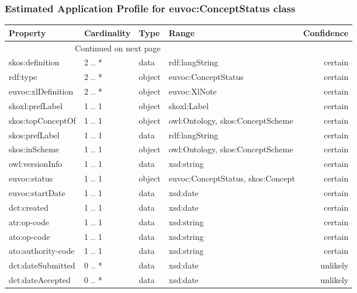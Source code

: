 \documentclass[10pt,a4paper,titlepage,final]{article}
\begin{document}
\subsubsection{Estimated Application Profile for euvoc:ConceptStatus class}
\begin{tabularx}{\textwidth}{lllXr}
\toprule
           Property & Cardinality &    Type &                              Range & Confidence \\
\midrule
\endhead
\midrule
\multicolumn{3}{r}{{Continued on next page}} \\
\midrule
\endfoot

\bottomrule
\endlastfoot
    skos:definition &      2 .. * &    data &                     rdf:langString &    certain \\
           rdf:type &      2 .. * &  object &                euvoc:ConceptStatus &    certain \\
 euvoc:xlDefinition &      2 .. * &  object &                       euvoc:XlNote &    certain \\
    skoxl:prefLabel &      1 .. 1 &  object &                        skoxl:Label &    certain \\
  skos:topConceptOf &      1 .. 1 &  object &   owl:Ontology, skos:ConceptScheme &    certain \\
     skos:prefLabel &      1 .. 1 &    data &                     rdf:langString &    certain \\
      skos:inScheme &      1 .. 1 &  object &   owl:Ontology, skos:ConceptScheme &    certain \\
    owl:versionInfo &      1 .. 1 &    data &                         xsd:string &    certain \\
       euvoc:status &      1 .. 1 &  object &  euvoc:ConceptStatus, skos:Concept &    certain \\
    euvoc:startDate &      1 .. 1 &    data &                           xsd:date &    certain \\
        dct:created &      1 .. 1 &    data &                           xsd:date &    certain \\
        atr:op-code &      1 .. 1 &    data &                         xsd:string &    certain \\
        ato:op-code &      1 .. 1 &    data &                         xsd:string &    certain \\
 ato:authority-code &      1 .. 1 &    data &                         xsd:string &    certain \\
  dct:dateSubmitted &      0 .. * &    data &                           xsd:date &   unlikely \\
   dct:dateAccepted &      0 .. * &    data &                           xsd:date &   unlikely \\
\end{tabularx}
\end{document}
